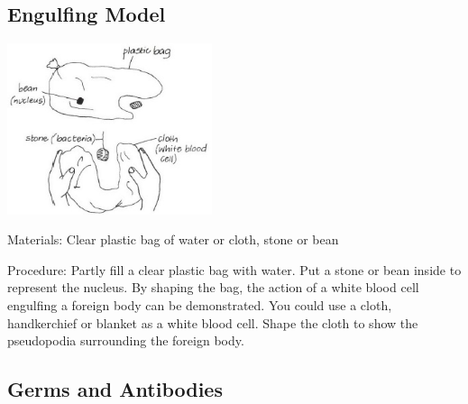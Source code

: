 \begin{multicols}{2}
\subsection{Engulfing Model} %

\begin{center}
\includegraphics[width=0.45\textwidth]{./img/vso/engulfing.jpg}
\end{center}

\begin{description*}
\item[Materials:]{Clear plastic bag of water or cloth, stone or bean}
\item[Procedure:]{Partly fill a clear plastic bag with
water. Put a stone or bean inside
to represent the nucleus. By
shaping the bag, the action of a
white blood cell engulfing a
foreign body can be
demonstrated. You could use a
cloth, handkerchief or blanket as
a white blood cell. Shape the
cloth to show the pseudopodia
surrounding the foreign body.}
\end{description*}

\subsection{Germs and Antibodies} %


\end{multicols}
